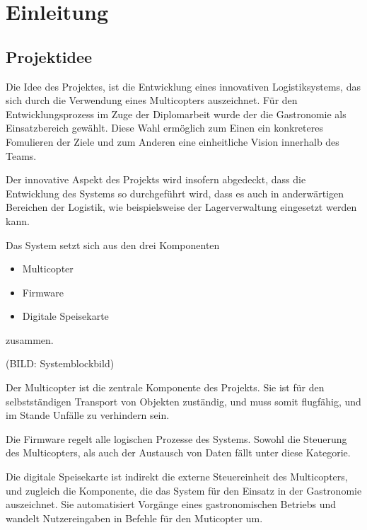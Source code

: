 \chapter{Einleitung}
\renewcommand{\kapitelautor}{Autor: Markus Kaiser}

\section{Projektidee}
Die Idee des Projektes, ist die Entwicklung eines innovativen Logistiksystems, das sich durch die Verwendung eines Multicopters auszeichnet.
Für den Entwicklungsprozess im Zuge der Diplomarbeit wurde der die Gastronomie als Einsatzbereich gewählt. Diese Wahl ermöglich zum Einen
ein konkreteres Fomulieren der Ziele und zum Anderen eine einheitliche Vision innerhalb des Teams.

Der innovative Aspekt des Projekts wird insofern abgedeckt, dass die Entwicklung des Systems so durchgeführt wird,
dass es auch in anderwärtigen Bereichen der Logistik, wie beispielsweise der Lagerverwaltung eingesetzt werden kann.

Das System setzt sich aus den drei Komponenten

\begin{itemize}
  \item Multicopter
  \item Firmware
  \item Digitale Speisekarte
\end{itemize}

zusammen.

(BILD: Systemblockbild)

Der Multicopter ist die zentrale Komponente des Projekts. Sie ist für den selbstständigen Transport von Objekten zuständig,
und muss somit flugfähig, und im Stande Unfälle zu verhindern sein.

Die Firmware regelt alle logischen Prozesse des Systems. Sowohl die Steuerung des Multicopters, als auch der
Austausch von Daten fällt unter diese Kategorie.

Die digitale Speisekarte ist indirekt die externe Steuereinheit des Multicopters, und zugleich die Komponente,
die das System für den Einsatz in der Gastronomie auszeichnet. Sie automatisiert Vorgänge eines gastronomischen
Betriebs und wandelt Nutzereingaben in Befehle für den Muticopter um.

